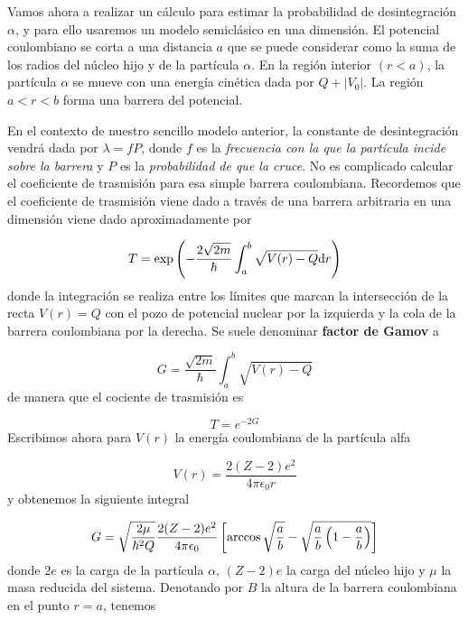 Vamos ahora a realizar un cálculo para estimar la probabilidad de desintegración $\alpha$, y para ello usaremos un modelo semiclásico en una dimensión. El potencial coulombiano se corta a una distancia $a$ que se puede considerar como la suma de los radios del núcleo hijo y de la partícula $\alpha$. En la región interior $(r<a)$, la partícula $\alpha$ se mueve con una energía cinética dada por $Q+|V_0|$. La región $a<r<b$ forma una barrera del potencial. 

En el contexto de nuestro sencillo modelo anterior, la constante de desintegración vendrá dada por $\lambda = fP$, donde $f$ es la \textit{frecuencia con la que la partícula incide sobre la barrera} y $P$ es la \textit{probabilidad de que la cruce}. No es complicado calcular el coeficiente de trasmisión para esa simple barrera coulombiana. Recordemos que el coeficiente de trasmisión viene dado a través de una barrera arbitraria en una dimensión viene dado aproximadamente por

\begin{equation}
    T = \exp \left( -\frac{2\sqrt{2m}}{\hbar } \int_a^b \sqrt{V(r)-Q}\mathrm{d} r \right)
\end{equation}
donde la integración se realiza entre los límites que marcan la intersección de la recta $V(r) = Q$ con el pozo de potencial nuclear por la izquierda y la cola de la barrera coulombiana por la derecha. Se suele denominar \textbf{factor de Gamov} a 

\begin{equation}
    G = \frac{\sqrt{2m}}{\hbar} \int_a^b \sqrt{V(r)-Q}
\end{equation}
de manera que el cociente de trasmisión es

\begin{equation}
    T = e^{-2G}
\end{equation}
Escribimos ahora para $V(r)$ la energía coulombiana de la partícula alfa 

\begin{equation}
    V(r) = \frac{2(Z-2)e^2}{4\pi \epsilon_0 r}
\end{equation}
y obtenemos la siguiente integral

\begin{equation}
    G = \sqrt{\frac{2\mu}{\hbar^2Q}} \frac{2(Z-2)e^2}{4 \pi \epsilon_0} \left[ \arccos \sqrt{\frac{a}{b}}- \sqrt{\frac{a}{b}\left( 1-\frac{a}{b} \right)} \right]
\end{equation}
donde $2e$ es la carga de la partícula $\alpha$, $(Z-2)e$ la carga del núcleo hijo y $\mu$ la masa reducida del sistema. Denotando por $B$ la altura de la barrera coulombiana en el punto $r=a$, tenemos 

